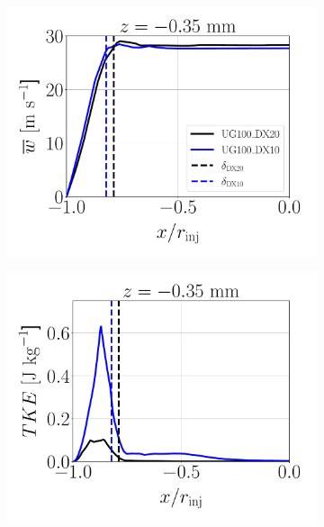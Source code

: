 \begin{figure}[ht]
\flushleft
\begin{subfigure}[b]{0.3\textwidth}
	\flushleft
   \includegraphics[scale=0.225]{./part2_developments/figures_ch5_resolved_JICF/instabilities_resolution/line_data_injector_uz_zm0p35}
\end{subfigure}
\hfill
\begin{subfigure}[b]{0.3\textwidth}
	\flushleft
   \includegraphics[scale=0.225]{./part2_developments/figures_ch5_resolved_JICF/instabilities_resolution/line_data_injector_TKE_zm0p35}
\end{subfigure}

\end{figure}
